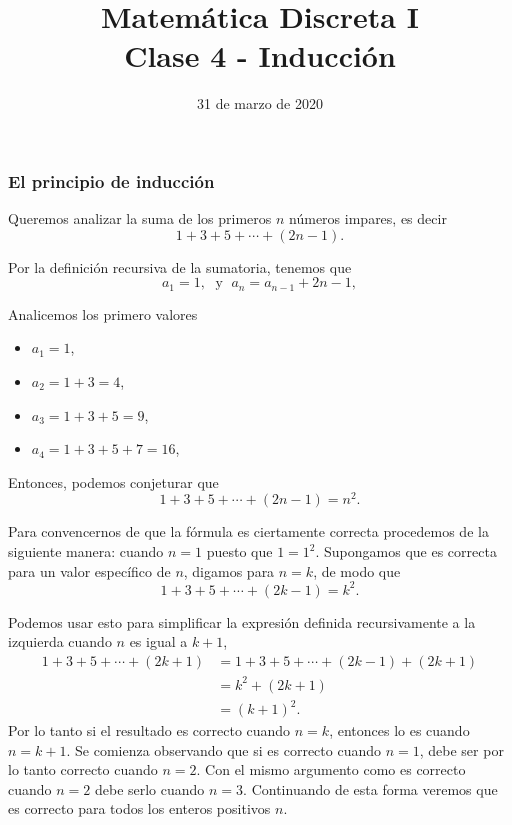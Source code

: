 \documentclass[handout]{beamer} %
\title[Clase 4 - Inducción]{Matemática Discreta I \\ Clase 4 - Inducción}
\institute[]{\normalsize FAMAF / UNC
	\\[\baselineskip] ${}^{}$
	\\[\baselineskip]
}
\date[02/04/2020]{31 de marzo   de 2020}
\begin{document}



\frame{\titlepage} 





\begin{frame}\frametitle{El principio de inducción} 

	Queremos  analizar la suma de los primeros $n$ números impares, es decir
	$$
	1+3+5+\cdots+(2n-1).
	$$
	
	Por la definición recursiva de la sumatoria,  tenemos que 
	\begin{equation*}
	a_1 = 1, \;\text{  y } \; a_n = a_{n-1} + 2n-1,
	\end{equation*}
	
	
	Analicemos los primero valores
	
	\begin{itemize}
		\item $a_1 = 1$,
		\item $a_2 = 1 + 3 = 4$, 
		\item $a_3 = 1 + 3 + 5 = 9$, 
		\item $a_4 = 1 + 3 + 5 + 7= 16 $, 
	\end{itemize}
	
\end{frame}


\begin{frame}	
	Entonces, podemos conjeturar que
	$$
	1+3+5+\cdots+(2n-1) = n^2.
	$$
	
	Para convencernos de que la fórmula es ciertamente correcta procedemos de la siguiente manera: cuando $n=1$ puesto que
	$1=1^2$.
	Supongamos que es correcta para un valor específico
	de $n$, digamos para $n=k$, de modo que
	$$
	1+3+5+\cdots+(2k-1) = k^2.
	$$



\end{frame}

\begin{frame}
		Podemos usar esto para simplificar la expresión definida
	recursivamente a la izquierda cuando $n$ es igual a $k+1$,
	$$
	\begin{aligned}
	1+3+5+\cdots+(2k+1) &= 1+3+5+\cdots+(2k-1) +(2k+1) \\
	&=k^2 +(2k+1) \\
	&=(k+1)^2.
	\end{aligned}
	$$
	Por lo tanto si el resultado es correcto cuando $n=k$, entonces lo es cuando $n=k+1$. Se comienza observando que si es correcto cuando $n=1$, debe ser por lo tanto correcto cuando $n=2$. Con el mismo argumento como es correcto cuando $n=2$ debe serlo cuando $n=3$. Continuando de esta forma veremos que es correcto para todos los enteros positivos $n$.
\end{frame}
\end{document}
